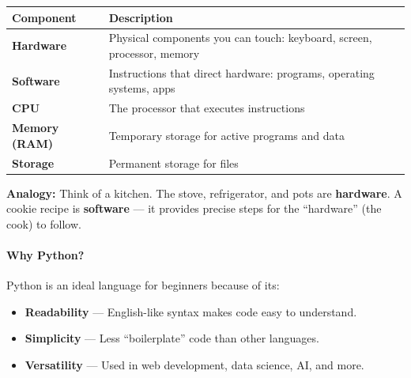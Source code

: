 \documentclass[
  justified,
  openright,
]{tufte-book}
\let\subsection\paragraph
\let\paragraph\paragraph
\let\subsection\paragraph
\let\paragraph\paragraph
\providecommand{\tightlist}{%
  \setlength{\itemsep}{0pt}\setlength{\parskip}{0pt}}
\begin{document}
\begin{fullwidth}{\def\LTcaptype{none} %
\begin{longtable}[]{@{}
  >{\raggedright\arraybackslash}p{}
  >{\raggedright\arraybackslash}p{}@{}}
\toprule\noalign{}
\begin{minipage}[b]{\linewidth}\raggedright
Component
\end{minipage} & \begin{minipage}[b]{\linewidth}\raggedright
Description
\end{minipage} \\
\midrule\noalign{}
\endhead
\bottomrule\noalign{}
\endlastfoot
\textbf{Hardware} & Physical components you can touch: keyboard, screen,
processor, memory \\
\textbf{Software} & Instructions that direct hardware: programs,
operating systems, apps \\
\textbf{CPU} & The processor that executes instructions \\
\textbf{Memory (RAM)} & Temporary storage for active programs and
data \\
\textbf{Storage} & Permanent storage for files \\
\end{longtable}
}
\end{fullwidth}

\textbf{Analogy:} Think of a kitchen. The stove, refrigerator, and pots
are \textbf{hardware}. A cookie recipe is \textbf{software} --- it
provides precise steps for the ``hardware'' (the cook) to follow.

\subsection{Why Python?}\label{why-python}

Python is an ideal language for beginners because of its:

\begin{itemize}
\tightlist
\item
  \textbf{Readability} --- English-like syntax makes code easy to
  understand.
\item
  \textbf{Simplicity} --- Less ``boilerplate'' code than other
  languages.
\item
  \textbf{Versatility} --- Used in web development, data science, AI,
  and more.
\end{itemize}
\end{document}
